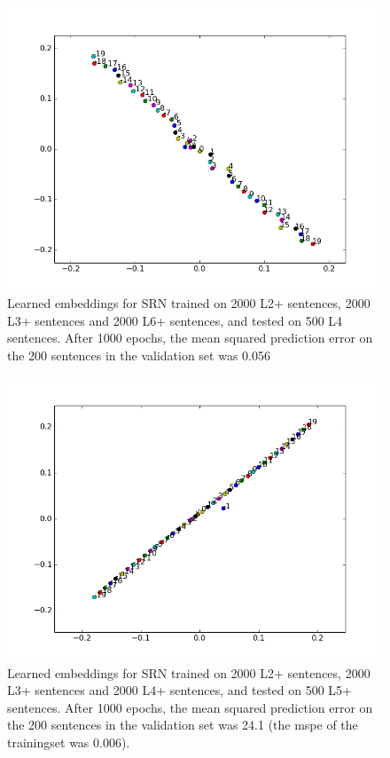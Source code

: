 \documentclass{article}
\begin{document}
\begin{figure}[!ht]
        \includegraphics[scale=0.8]{SRN_L2L3L6.png}
        \caption{Learned embeddings for SRN trained on 2000 L2+ sentences, 2000 L3+ sentences and 2000 L6+ sentences, and tested on 500 L4 sentences. After 1000 epochs, the mean squared prediction error on the 200 sentences in the validation set was 0.056}\label{fig:SRN_L2L3L6_testL5}
\end{figure}

\begin{figure}[!ht]
        \includegraphics[scale=0.8]{SRN_L2L3L4.png}
        \caption{Learned embeddings for SRN trained on 2000 L2+ sentences, 2000 L3+ sentences and 2000 L4+ sentences, and tested on 500 L5+ sentences. After 1000 epochs, the mean squared prediction error on the 200 sentences in the validation set was 24.1 (the mspe of the trainingset was 0.006).}\label{fig:SRN_L2L3L4_testL5}
\end{figure}
\end{document}
